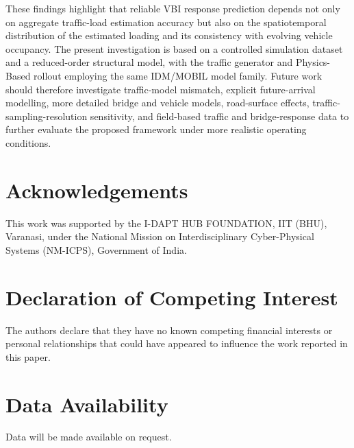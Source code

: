 \documentclass[journal]{IEEEtran}
\begin{document}
These findings highlight that reliable VBI response prediction depends not only on aggregate traffic-load estimation accuracy but also on the spatiotemporal distribution of the estimated loading and its consistency with evolving vehicle occupancy. The present investigation is based on a controlled simulation dataset and a reduced-order structural model, with the traffic generator and Physics-Based rollout employing the same IDM/MOBIL model family. Future work should therefore investigate traffic-model mismatch, explicit future-arrival modelling, more detailed bridge and vehicle models, road-surface effects, traffic-sampling-resolution sensitivity, and field-based traffic and bridge-response data to further evaluate the proposed framework under more realistic operating conditions.



\section*{Acknowledgements}

This work was supported by the I-DAPT HUB FOUNDATION,
IIT (BHU), Varanasi, under the National Mission on
Interdisciplinary Cyber-Physical Systems (NM-ICPS),
Government of India.

\section*{Declaration of Competing Interest}

The authors declare that they have no known competing
financial interests or personal relationships that could
have appeared to influence the work reported in this paper.

\section*{Data Availability}

Data will be made available on request.

\FloatBarrier





\end{document}
